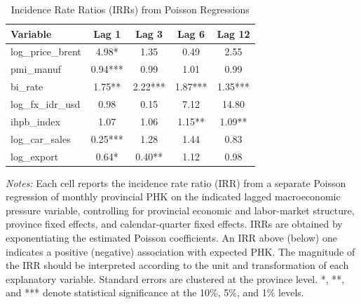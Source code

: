 \begin{table}[htbp]
\centering
\caption{Incidence Rate Ratios (IRRs) from Poisson Regressions}
\small
\begin{tabular}{lcccc}
\toprule
Variable & Lag 1 & Lag 3 & Lag 6 & Lag 12 \\ \midrule
log\_price\_brent&4.98*&1.35&0.49&2.55\\
pmi\_manuf&0.94***&0.99&1.01&0.99\\
bi\_rate&1.75**&2.22***&1.87***&1.35***\\
log\_fx\_idr\_usd&0.98&0.15&7.12&14.80\\
ihpb\_index&1.07&1.06&1.15**&1.09**\\
log\_car\_sales&0.25***&1.28&1.44&0.83\\
log\_export&0.64*&0.40**&1.12&0.98\\
\bottomrule
\end{tabular}
\vspace{0.2cm}
\begin{minipage}{0.95\linewidth}
\footnotesize
\textit{Notes:} Each cell reports the incidence rate ratio (IRR) from a separate Poisson regression of monthly provincial PHK on the indicated lagged macroeconomic pressure variable, controlling for provincial economic and labor-market structure, province fixed effects, and calendar-quarter fixed effects. IRRs are obtained by exponentiating the estimated Poisson coefficients. An IRR above (below) one indicates a positive (negative) association with expected PHK. The magnitude of the IRR should be interpreted according to the unit and transformation of each explanatory variable. Standard errors are clustered at the province level. *, **, and *** denote statistical significance at the 10\%, 5\%, and 1\% levels.
\end{minipage}
\end{table}
